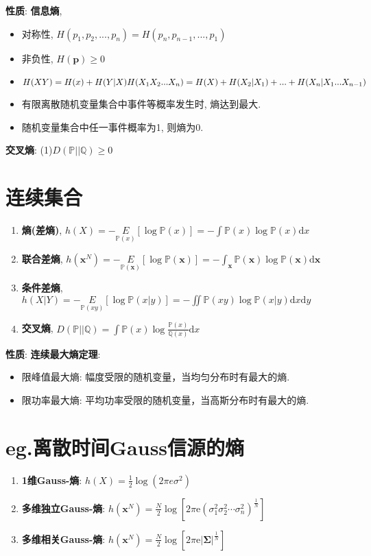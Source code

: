 \documentclass{article}
\newcommand{\env}[2]{\begin{#1}#2\end{#1}}
\newcommand{\defi}[2]{\textbf{#1}, #2}
\newcommand{\bb}{\boldsymbol}
\newcommand{\P}{\mathbb P}
\newcommand{\d}{\mathrm d}
\begin{document}
                \textbf{性质}: \textbf{信息熵}, 
                    \env{itemize}{
                        \item 对称性, $H(p_1, p_2, ..., p_n) = H(p_n, p_{n-1}, ..., p_1)$
                        \item 非负性, $H(\bb p) \ge 0$
                        \item $H(XY) = H(x) + H(Y|X) \\ H(X_1 X_2 ... X_n) = H(X) + H(X_2|X_1) + ... + H(X_n|X_1...X_{n-1})$
                        \item 有限离散随机变量集合中事件等概率发生时, 熵达到最大.
                        \item 随机变量集合中任一事件概率为1, 则熵为0.
                    } 
                    \textbf{交叉熵}: (1)$D(\P || \mathbb Q) \ge 0$

            \section{连续集合}
                \env{enumerate}{
                    \item \defi{熵(差熵)}{$h(X)=-\underset{\P(x)}{E}[\log \P(x)]=-\int \P(x) \log \P(x) \d x$}
                    \item \defi{联合差熵}{$h(\bb x^{N})=-\underset{\P(\bb x)}{E}[\log \P(\bb x)]=-\int_{\bb x} \P(\bb x) \log \P(\bb x) \d \bb x$}
                    \item \defi{条件差熵}{$h(X|Y)=-\underset{\P(xy)}{E}[\log \P(x|y)]=-\iint \P(xy) \log \P(x|y) \d x \d y$}
                    \item \defi{交叉熵}{$D(\P || \mathbb Q)=\int \P(x) \log \frac{\P(x)}{\mathbb Q(x)} \d x$}
                }
                
                \textbf{性质}: 
                    \textbf{连续最大熵定理}: \env{itemize}{
                    \item 限峰值最大熵: 幅度受限的随机变量，当均匀分布时有最大的熵.
                    \item 限功率最大熵: 平均功率受限的随机变量，当高斯分布时有最大的熵.
                    }
                
                \section{\textbf{eg.}离散时间Gauss信源的熵}
                    \env{enumerate}{
                    \item \textbf{1维Gauss-熵}: $h(X) = \frac{1}{2} \log \left(2 \pi e \sigma^2\right)$
                    \item \textbf{多维独立Gauss-熵}: $h\left(\bb x^{N}\right)=\frac{N}{2} \log \left[2 \pi \mathrm{e}\left(\sigma_1^2 \sigma_2^2 \cdots \sigma_{n}^2\right)^{\frac{1}{N}}\right]$
                    \item \textbf{多维相关Gauss-熵}: $h\left(\bb x^{N}\right)=\frac{N}{2} \log \left[2 \pi \mathrm{e} |\bb \Sigma|^{\frac{1}{N}}\right]$
                    }
    
\end{document}
